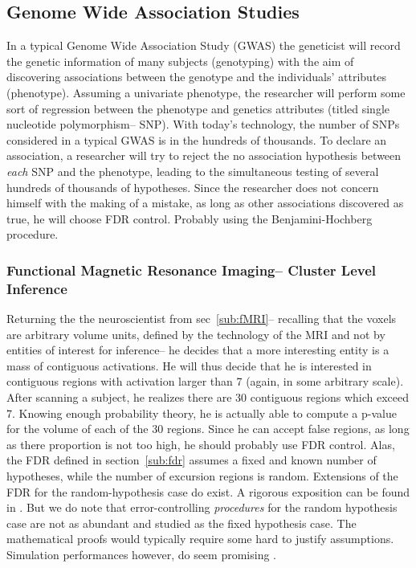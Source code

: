 \documentclass[draft,12pt]{article}
\begin{document}
\subsection{Genome Wide Association Studies}
In a typical Genome Wide Association Study (GWAS) the geneticist will record the genetic information of many subjects (genotyping) with the aim of discovering associations between the genotype and the individuals' attributes (phenotype). Assuming a univariate phenotype, the researcher will perform some sort of regression between the phenotype and genetics attributes (titled single nucleotide polymorphism-- SNP). With today's technology, the number of SNPs considered in a typical GWAS is in the hundreds of thousands. To declare an association, a researcher will try to reject the no association hypothesis between \emph{each} SNP and the phenotype, leading to the simultaneous testing of several hundreds of thousands of hypotheses. Since the researcher does not concern himself with the making of a mistake, as long as other associations discovered as true, he will choose FDR control. Probably using the Benjamini-Hochberg procedure.



\subsubsection{Functional Magnetic Resonance Imaging-- Cluster Level Inference}
Returning the the neuroscientist from sec~\ref{sub:fMRI}-- recalling that the voxels are arbitrary volume units, defined by the technology of the MRI and not by entities of interest for inference-- he decides that a more interesting entity is a mass of contiguous activations. He will thus decide that he is interested in contiguous regions with activation larger than 7 (again, in some arbitrary scale). After scanning a subject, he realizes there are 30 contiguous regions which exceed 7. Knowing enough probability theory, he is actually able to compute a p-value for the volume of each of the 30 regions. Since he can accept false regions, as long as there proportion is not too high, he should probably use FDR control. Alas, the FDR defined in section~\ref{sub:fdr} assumes a fixed and known number of hypotheses, while the number of excursion regions is random. Extensions of the FDR for the random-hypothesis case do exist. A rigorous exposition can be found in  \citet{siegmund_false_2011}. But we do note that error-controlling \emph{procedures} for the random hypothesis case are not as abundant and studied as the fixed hypothesis case. The mathematical proofs would typically require some hard to justify assumptions. Simulation performances however, do seem promising \citep{chumbley_false_2009,chumbley_topological_2010}.
\end{document}
